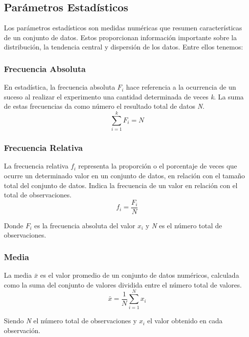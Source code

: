 \documentclass{article}
\begin{document}
\subsection{Parámetros Estadísticos}
\par Los parámetros estadísticos son medidas numéricas que resumen características de un conjunto de datos. Estos proporcionan información importante sobre la distribución, la tendencia central y dispersión de los datos. Entre ellos tenemos:

    \subsubsection{Frecuencia Absoluta}
    \par En estadística, la frecuencia absoluta \(F_i\) hace referencia a la ocurrencia de un suceso al realizar el experimento una cantidad determinada de veces \textit{k}. La suma de estas frecuencias da como número el resultado total de datos \textit{N}.
        \begin{equation}
            \sum_{i=1}^{k} F_i = N
        \end{equation}
        
    \subsubsection{Frecuencia Relativa}
    \par La frecuencia relativa \(f_i\) representa la proporción o el porcentaje de veces que ocurre un determinado valor en un conjunto de datos, en relación con el tamaño total del conjunto de datos. Indica la frecuencia de un valor en relación con el total de observaciones.
        \begin{equation}
            f_i = \frac{F_i}{N}
        \end{equation}
    \par Donde \(F_i\) es la frecuencia absoluta del valor \(x_i\) y \textit{N} es el número total de observaciones.
    
    \subsubsection{Media}
    \par La media  \( \bar{x} \) es el valor promedio de un conjunto de datos numéricos, calculada como la suma del conjunto de valores dividida entre el número total de valores.
    \begin{equation}
        \bar{x} = \frac{1}{N} \sum_{i=1}^{N} x_i
        \label{eq:media}
    \end{equation}
    \par Siendo \textit{N} el número total de observaciones y \textit{\textbf{\(x_i\)}} el valor obtenido en cada observación.
    
\end{document}
